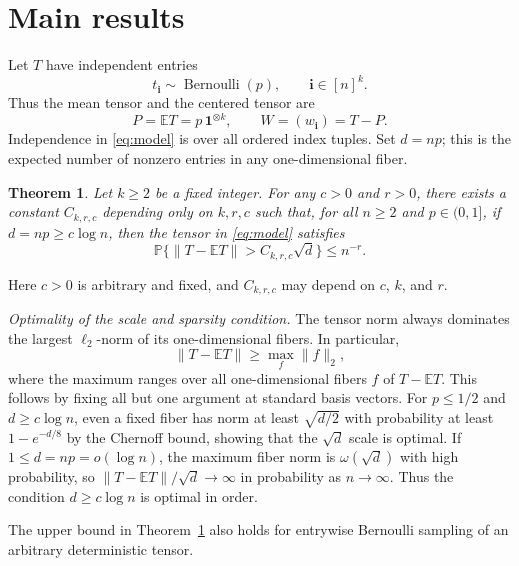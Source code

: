 \documentclass[11pt,reqno]{amsart}
\numberwithin{equation}{section}
\newtheorem{theorem}{Theorem}[section]
\theoremstyle{definition}
\theoremstyle{remark}
\newcommand{\E}{\mathbb E}
\newcommand{\Pp}{\mathbb P}
\newcommand{\one}{\mathbf 1}
\begin{document}
\section{Main results}\label{sec:main}

Let $T$ have independent entries
\begin{equation}\label{eq:model}
 t_{\mathbf i}\sim\operatorname{Bernoulli}(p),
 \qquad \mathbf i\in[n]^k.
\end{equation}
Thus the mean tensor and the centered tensor are
\[
 P=\E T=p\,\one^{\otimes k},
 \qquad W=(w_{\mathbf i})=T-P.
\]
Independence in \eqref{eq:model} is over all ordered index tuples.
Set $d=np$; this is the expected number of nonzero entries in any
one-dimensional fiber.

\begin{theorem}\label{thm:main}
Let $k\ge2$ be a fixed integer. For any $c>0$ and $r>0$, there exists a
constant $C_{k,r,c}$ depending only on $k,r,c$ such that, for all
$n\ge2$ and $p\in(0,1]$, if $ d=np\ge c\log n$,  then the tensor in \eqref{eq:model} satisfies
\begin{equation}\label{eq:main}
 \Pp\{\|T-\E T\|>C_{k,r,c}\sqrt d\}\le n^{-r}.
\end{equation}
\end{theorem}

Here $c>0$ is arbitrary and fixed, and $C_{k,r,c}$ may depend on $c$,
$k$, and $r$.

\medskip
\noindent\textit{Optimality of the scale and sparsity condition.}
The tensor norm always dominates the largest $\ell_2$-norm of its
one-dimensional fibers. In particular,
\[
 \|T-\E T\|\ge\max_f\|f\|_2,
\]
where the maximum ranges over all one-dimensional fibers $f$ of
$T-\E T$. This follows by fixing all but one argument at standard
basis vectors. For $p\le1/2$ and $d\ge c\log n$, even a fixed fiber
has norm at least $\sqrt{d/2}$ with probability at least
$1-e^{-d/8}$ by the Chernoff bound, showing that the $\sqrt d$ scale
is optimal. If $1\le d=np=o(\log n)$, the maximum fiber norm is
$\omega(\sqrt d)$ with high probability, so
$\|T-\E T\|/\sqrt d\to\infty$ in probability as $n\to\infty$.
Thus the condition $d\ge c\log n$ is optimal in order.


\bigskip 

The upper bound in Theorem~\ref{thm:main} also holds for entrywise
Bernoulli sampling of an arbitrary
deterministic tensor. 
\end{document}
